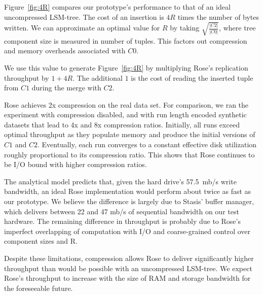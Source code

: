 \documentclass{vldb}
\newcommand{\rows}{Rose\xspace}
\newcommand{\rowss}{Rose's\xspace}
\begin{document}
Figure~\ref{fig:4R} compares our prototype's performance to that of an
ideal uncompressed LSM-tree.  The cost of an insertion is $4R$ times
the number of bytes written.  We can approximate an optimal value for
$R$ by taking $\sqrt{\frac{|C2|}{|C0|}}$, where tree component size is
measured in number of tuples.  This factors out compression and memory
overheads associated with $C0$.

We use this value to
generate Figure~\ref{fig:4R} by multiplying \rowss replication
throughput by $1 + 4R$.  The additional $1$ is the cost of reading the
inserted tuple from $C1$ during the merge with $C2$.

\rows achieves 2x compression on the real data set.  For comparison,
we ran the experiment with compression disabled, and with
run length encoded synthetic datasets that lead to 4x and 8x compression
ratios.  Initially, all runs exceed optimal throughput as they
populate memory and produce the initial versions of $C1$ and $C2$.
Eventually, each run converges to a constant effective disk
utilization roughly proportional to its compression ratio.  This shows
that \rows continues to be I/O bound with higher compression ratios.

The analytical model predicts that, given the hard drive's 57.5~mb/s
write bandwidth, an ideal \rows implementation would perform about
twice as fast as our prototype.  We believe the difference is largely
due to Stasis' buffer manager, which delivers between 22 and 47 mb/s
of sequential bandwidth on our test hardware.  The remaining
difference in throughput is probably due to \rowss imperfect
overlapping of computation with I/O and coarse-grained control over
component sizes and R.

Despite these limitations, compression allows \rows to deliver significantly
higher throughput than would be possible with an uncompressed LSM-tree.  We expect
\rowss throughput to increase with the size of RAM and storage
bandwidth for the foreseeable future.

\end{document}
